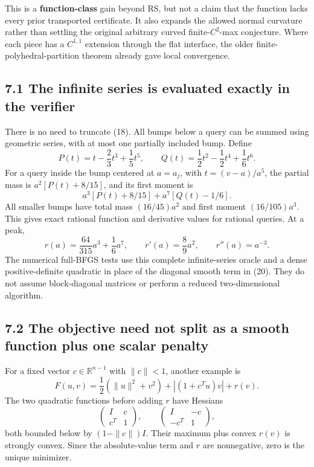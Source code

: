 \documentclass[10pt,oneside,openany]{book}
\theoremstyle{remark}\newtheorem{remark}{Remark}[chapter]
\begin{document}
This is a \textbf{function-class} gain beyond RS, but not a claim that
the function lacks every prior transported certificate. It also expands
the allowed normal curvature rather than settling the original arbitrary
curved finite-\(C^2\)-max conjecture. Where each piece has a \(C^{1,1}\)
extension through the flat interface, the older
finite-polyhedral-partition theorem already gave local convergence.

\subsection{7.1 The infinite series is evaluated exactly in the
verifier}\label{U:the-infinite-series-is-evaluated-exactly-in-the-verifier}

There is no need to truncate (18). All bumps below a query can be summed
using geometric series, with at most one partially included bump. Define
\[
 P(t)=t-\frac23t^3+\frac15t^5,\qquad
 Q(t)=\frac12t^2-\frac12t^4+\frac16t^6.
\] For a query inside the bump centered at \(a=a_j\), with
\(t=(v-a)/a^5\), the partial mass is \(a^2[P(t)+8/15]\), and its first
moment is \[
 a^3[P(t)+8/15]+a^7[Q(t)-1/6].
\] All smaller bumps have total mass \((16/45)a^2\) and first moment
\((16/105)a^3\). This gives exact rational function and derivative
values for rational queries. At a peak, \[
 r(a)=\frac{64}{315}a^3+\frac16a^7,\qquad
 r'(a)=\frac89a^2,\qquad r''(a)=a^{-3}.
\] The numerical full-BFGS tests use this complete infinite-series
oracle and a dense positive-definite quadratic in place of the diagonal
smooth term in (20). They do not assume block-diagonal matrices or
perform a reduced two-dimensional algorithm.

\subsection{7.2 The objective need not split as a smooth function plus
one scalar
penalty}\label{U:the-objective-need-not-split-as-a-smooth-function-plus-one-scalar-penalty}

For a fixed vector \(c\in\mathbb R^{n-1}\) with \(\|c\|<1\), another
example is \[
 F(u,v)=\frac12(\|u\|^2+v^2)+|(1+c^Tu)v|+r(v).
\] The two quadratic functions before adding \(r\) have Hessians \[
 \begin{pmatrix}I&c\\c^T&1\end{pmatrix},\qquad
 \begin{pmatrix}I&-c\\-c^T&1\end{pmatrix},
\] both bounded below by \((1-\|c\|)I\). Their maximum plus convex
\(r(v)\) is strongly convex. Since the absolute-value term and \(r\) are
nonnegative, zero is the unique minimizer.
\end{document}
